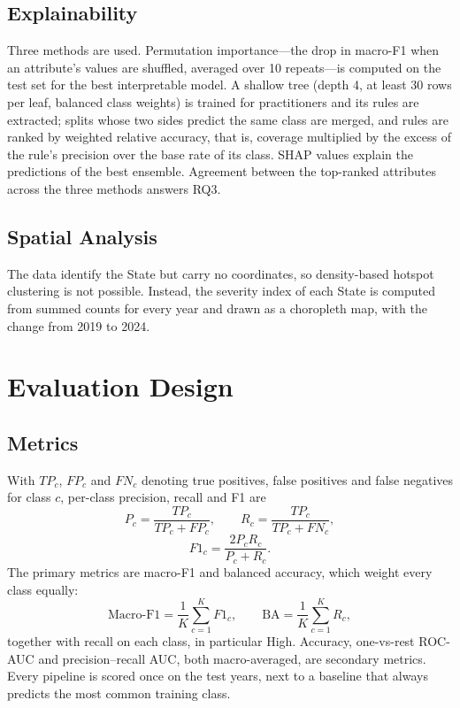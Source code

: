 \documentclass[conference]{IEEEtran}
\begin{document}
\subsection{Explainability}
Three methods are used. Permutation importance---the drop in macro-F1 when an attribute's values are shuffled, averaged over 10 repeats---is computed on the test set for the best interpretable model. A shallow tree (depth 4, at least 30 rows per leaf, balanced class weights) is trained for practitioners and its rules are extracted; splits whose two sides predict the same class are merged, and rules are ranked by weighted relative accuracy, that is, coverage multiplied by the excess of the rule's precision over the base rate of its class. SHAP values \cite{lundberg2017} explain the predictions of the best ensemble. Agreement between the top-ranked attributes across the three methods answers RQ3.

\subsection{Spatial Analysis}
The data identify the State but carry no coordinates, so density-based hotspot clustering is not possible. Instead, the severity index of each State is computed from summed counts for every year and drawn as a choropleth map, with the change from 2019 to 2024.

\section{Evaluation Design}
\label{sec:evaluation}

\subsection{Metrics}
With $TP_c$, $FP_c$ and $FN_c$ denoting true positives, false positives and false negatives for class $c$, per-class precision, recall and F1 are
\begin{equation}
P_c = \frac{TP_c}{TP_c + FP_c}, \qquad R_c = \frac{TP_c}{TP_c + FN_c},
\end{equation}
\begin{equation}
F1_c = \frac{2 P_c R_c}{P_c + R_c}.
\end{equation}
The primary metrics are macro-F1 and balanced accuracy, which weight every class equally:
\begin{equation}
\text{Macro-F1} = \frac{1}{K}\sum_{c=1}^{K} F1_c, \qquad \text{BA} = \frac{1}{K}\sum_{c=1}^{K} R_c,
\end{equation}
together with recall on each class, in particular High. Accuracy, one-vs-rest ROC-AUC and precision--recall AUC, both macro-averaged, are secondary metrics. Every pipeline is scored once on the test years, next to a baseline that always predicts the most common training class.
\end{document}
